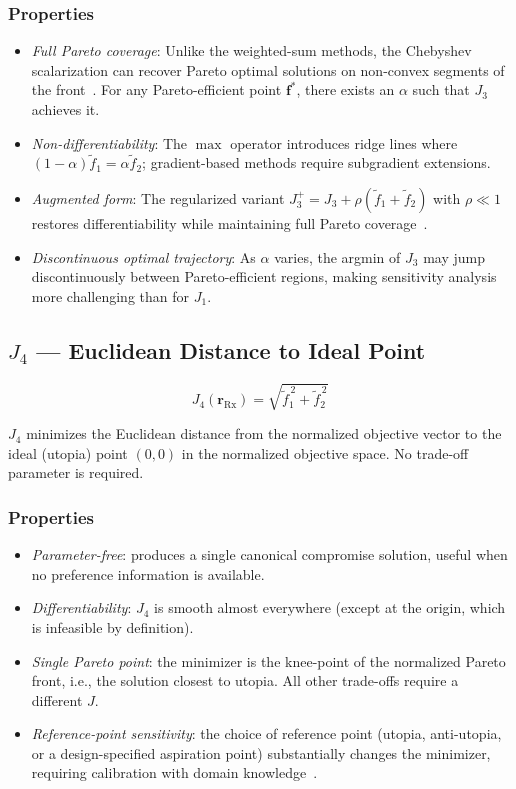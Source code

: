 \documentclass[journal]{IEEEtran}
\newcommand{\Rx}{\mathrm{Rx}}
\newcommand{\rRx}{\mathbf{r}_{\Rx}}
\begin{document}
\subsubsection*{Properties}
\begin{itemize}
  \item \emph{Full Pareto coverage}: Unlike the weighted-sum methods, the
    Chebyshev scalarization can recover Pareto optimal solutions on non-convex
    segments of the front~\cite{das1997, miettinen1998}. For any
    Pareto-efficient point $\mathbf{f}^*$, there exists an $\alpha$ such that
    $J_3$ achieves it.
  \item \emph{Non-differentiability}: The $\max$ operator introduces ridge lines
    where $(1-\alpha)\tilde{f}_1 = \alpha\tilde{f}_2$; gradient-based methods
    require subgradient extensions.
  \item \emph{Augmented form}: The regularized variant
    $J_3^{+} = J_3 + \rho(\tilde{f}_1 + \tilde{f}_2)$ with $\rho \ll 1$
    restores differentiability while maintaining full Pareto
    coverage~\cite{messac2003}.
  \item \emph{Discontinuous optimal trajectory}: As $\alpha$ varies, the
    argmin of $J_3$ may jump discontinuously between Pareto-efficient regions,
    making sensitivity analysis more challenging than for $J_1$.
\end{itemize}

\subsection{\texorpdfstring{$J_4$}{J4} — Euclidean Distance to Ideal Point}

\begin{equation}
  J_4(\rRx) = \sqrt{\tilde{f}_1^{\,2} + \tilde{f}_2^{\,2}}
  \label{eq:J4}
\end{equation}

$J_4$ minimizes the Euclidean distance from the normalized objective vector to
the ideal (utopia) point $(0, 0)$ in the normalized objective space. No
trade-off parameter is required.

\subsubsection*{Properties}
\begin{itemize}
  \item \emph{Parameter-free}: produces a single canonical compromise solution,
    useful when no preference information is available.
  \item \emph{Differentiability}: $J_4$ is smooth almost everywhere (except at
    the origin, which is infeasible by definition).
  \item \emph{Single Pareto point}: the minimizer is the knee-point of the
    normalized Pareto front, i.e., the solution closest to utopia. All other
    trade-offs require a different $J$.
  \item \emph{Reference-point sensitivity}: the choice of reference point
    (utopia, anti-utopia, or a design-specified aspiration point) substantially
    changes the minimizer, requiring calibration with domain
    knowledge~\cite{deb2001}.
\end{itemize}
\end{document}
